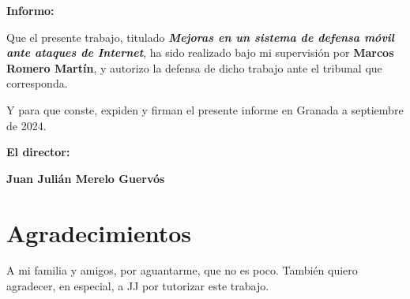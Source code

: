 \vspace{0.5cm}

\textbf{Informo:}

\vspace{0.5cm}

Que el presente trabajo, titulado \textit{\textbf{Mejoras en un sistema de defensa móvil ante ataques de Internet}},
ha sido realizado bajo mi supervisión por \textbf{Marcos Romero Martín}, y autorizo la defensa de dicho trabajo ante el tribunal
que corresponda.

\vspace{0.5cm}

Y para que conste, expiden y firman el presente informe en Granada a septiembre de 2024.

\vspace{1cm}

\textbf{El director: }

\vspace{5cm}

\noindent \textbf{Juan Julián Merelo Guervós}

\chapter*{Agradecimientos}
A mi familia y amigos, por aguantarme, que no es poco. También quiero agradecer, en especial, a JJ por tutorizar este trabajo.